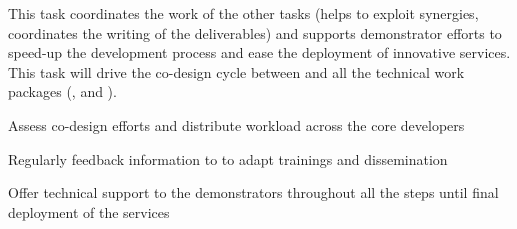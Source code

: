 \begin{task}[
  title=Co-design and technical support,
  id=codesign-support,
  lead=SRL,
  PM=15,
  wphases={0-48},
  partners={XFEL,EGI,CDS,INSERM,QS,SIL,UIO,UPSUD,WTT,EP}
]


This task coordinates the work of the other  tasks
(helps to exploit synergies, coordinates the writing of the
deliverables) and supports demonstrator efforts to speed-up the
development process and ease the deployment of innovative
services. This task will drive the co-design cycle between
 and all the technical work packages
(,  and ).

\begin{compactitem}
\item Assess co-design efforts and distribute workload across the core
  developers
\item Regularly feedback information to  to adapt
  trainings and dissemination
\item Offer technical support to the demonstrators throughout all the
  steps until final deployment of the services
\end{compactitem}

\end{task}
